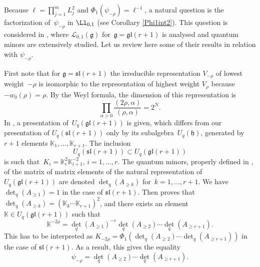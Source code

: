 \begin{Remark}\label{factell} Because $\ell =\prod_{j=1}^m L_j^2$ and $\Phi_1(\psi_{-\rho}) = \ell^{-1}$, a natural question is the factorization of~$\psi_{-\rho}$ in $\Ll_{0,1}$ (see Corollary \ref{Phi1int2}). This question is considered in \cite{JW}, where ${\mathcal L}_{0,1}({\mathfrak g})$ for~${{\mathfrak g}=\mathfrak{gl}(r+1)}$ is analysed and quantum minors are extensively studied. Let us review here some of their results in relation with $\psi_{-\rho}$.

First note that for ${\mathfrak g}=\mathfrak{sl}(r+1)$ the irreducible representation $V_{-\rho}$ of lowest weight~${-\rho}$ is isomorphic to the representation of highest weight $V_{\rho}$ because $-w_0(\rho)=\rho$. By the Weyl formula, the dimension of this representation is
\[ \prod_{\alpha>0}\frac{(2\rho,\alpha)}{(\rho,\alpha)}=2^N.
\]
 In \cite{KS}, a presentation of~${U_q(\mathfrak{gl}(r\!+1))}$ is given, which differs from our presentation of ${U_q(\mathfrak{sl}(r\!+1))}$ only by its subalgebra~${U_q({\mathfrak h})}$, generated by $r+1$ elements ${\mathbb K}_1,\dots , {\mathbb K}_{r+1}$. The inclusion
 \[U_q(\mathfrak{sl}(r+1))\subset U_q(\mathfrak{gl}(r+1))
 \]
 is such that~${K_i={\mathbb K}_i^2{\mathbb K}_{i+1}^{-2}}$, $i=1,\dots,r$. The quantum minors, properly defined in \cite{JW}, of the matrix of matrix elements of the natural representation of $U_q(\mathfrak{gl}(r+1))$ are denoted $\det_q(A_{\geq k})$ for~${k=1,\dots ,r+1}$. We have $\det_q(A_{\geq 1})=1$ in the case of $\mathfrak{sl}(r+1)$. Then \cite{JW} proves that $\det_q(A_{\geq k})=({\mathbb K}_k\cdots{\mathbb K}_{r+1})^2$, and there exists an element $\mathbb{K}\in U_q(\mathfrak{gl}(r+1))$ such that
\[{\mathbb K}^{-2\rho}={\det}_q(A_{\geq 1})^{-r}{\det}_q(A_{\geq 2})\cdots {\det}_q(A_{\geq r+1}).\]
This has to be interpreted as $K_{-2\rho}=\Phi_1(\det_q(A_{\geq 2})\cdots \det_q(A_{\geq r+1}))$ in the case of $\mathfrak{sl}(r+1)$. As a result, this gives the equality
\[
\psi_{-\rho}={\det}_q(A_{\geq 2})\cdots {\det}_q(A_{\geq r+1}).
\]
\end{Remark}

